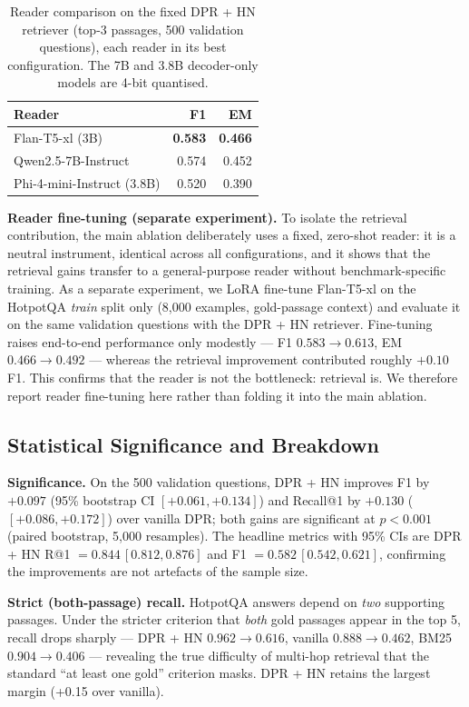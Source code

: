 \documentclass{llncs}
\begin{document}
\begin{table}[t]
\centering
\caption{Reader comparison on the fixed DPR + HN retriever (top-3 passages,
500 validation questions), each reader in its best configuration. The 7B and
3.8B decoder-only models are 4-bit quantised.}
\label{tab:readers}
\begin{tabular}{lrr}
\toprule
\textbf{Reader} & \textbf{F1} & \textbf{EM} \\
\midrule
Flan-T5-xl (3B)            & \textbf{0.583} & \textbf{0.466} \\
Qwen2.5-7B-Instruct        & 0.574 & 0.452 \\
Phi-4-mini-Instruct (3.8B) & 0.520 & 0.390 \\
\bottomrule
\end{tabular}
\end{table}

\noindent\textbf{Reader fine-tuning (separate experiment).}
To isolate the retrieval contribution, the main ablation deliberately uses a
fixed, zero-shot reader: it is a neutral instrument, identical across all
configurations, and it shows that the retrieval gains transfer to a
general-purpose reader without benchmark-specific training. As a separate
experiment, we LoRA fine-tune Flan-T5-xl on the HotpotQA \emph{train} split only
(8{,}000 examples, gold-passage context) and evaluate it on the same validation
questions with the DPR + HN retriever. Fine-tuning raises end-to-end
performance only modestly --- F1 $0.583 \to 0.613$, EM $0.466 \to 0.492$ ---
whereas the retrieval improvement contributed roughly $+0.10$ F1. This confirms
that the reader is not the bottleneck: retrieval is. We therefore report reader
fine-tuning here rather than folding it into the main ablation.

\subsection{Statistical Significance and Breakdown}

\noindent\textbf{Significance.}
On the 500 validation questions, DPR + HN improves F1 by $+0.097$ (95\%
bootstrap CI $[+0.061, +0.134]$) and Recall@1 by $+0.130$ ($[+0.086, +0.172]$)
over vanilla DPR; both gains are significant at $p < 0.001$ (paired bootstrap,
5{,}000 resamples). The headline metrics with 95\% CIs are DPR + HN
R@1 $= 0.844\,[0.812, 0.876]$ and F1 $= 0.582\,[0.542, 0.621]$, confirming the
improvements are not artefacts of the sample size.

\noindent\textbf{Strict (both-passage) recall.}
HotpotQA answers depend on \emph{two} supporting passages. Under the stricter
criterion that \emph{both} gold passages appear in the top 5, recall drops
sharply --- DPR + HN $0.962 \to 0.616$, vanilla $0.888 \to 0.462$, BM25
$0.904 \to 0.406$ --- revealing the true difficulty of multi-hop retrieval that
the standard ``at least one gold'' criterion masks. DPR + HN retains the
largest margin (+0.15 over vanilla).
\end{document}
